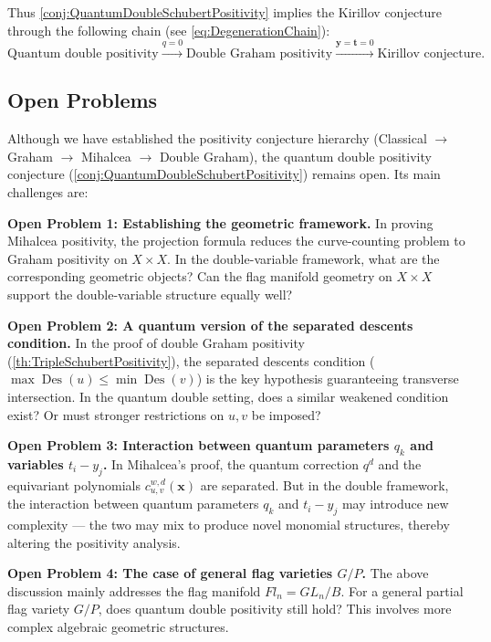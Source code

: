 Thus \cref{conj:QuantumDoubleSchubertPositivity} implies the Kirillov conjecture through the following chain (see \cref{eq:DegenerationChain}):
\begin{equation}
\label{eq:DegenerationChain}
\text{Quantum double positivity} \xrightarrow{q=0} \text{Double Graham positivity} \xrightarrow{\mathbf{y}=\mathbf{t}=0} \text{Kirillov conjecture}.
\end{equation}

\subsection{Open Problems}
\label{sec:OpenProblems}

Although we have established the positivity conjecture hierarchy (Classical $\to$ Graham $\to$ Mihalcea $\to$ Double Graham), the quantum double positivity conjecture (\cref{conj:QuantumDoubleSchubertPositivity}) remains open. Its main challenges are:

\textbf{Open Problem 1: Establishing the geometric framework.} In proving Mihalcea positivity, the projection formula reduces the curve-counting problem to Graham positivity on $X \times X$. In the double-variable framework, what are the corresponding geometric objects? Can the flag manifold geometry on $X \times X$ support the double-variable structure equally well?

\textbf{Open Problem 2: A quantum version of the separated descents condition.} In the proof of double Graham positivity (\cref{th:TripleSchubertPositivity}), the separated descents condition ($\max\operatorname{Des}(u) \leq \min\operatorname{Des}(v)$) is the key hypothesis guaranteeing transverse intersection. In the quantum double setting, does a similar weakened condition exist? Or must stronger restrictions on $u, v$ be imposed?

\textbf{Open Problem 3: Interaction between quantum parameters $q_k$ and variables $t_i - y_j$.} In Mihalcea's proof, the quantum correction $q^d$ and the equivariant polynomials $c_{u,v}^{w,d}(\mathbf{x})$ are separated. But in the double framework, the interaction between quantum parameters $q_k$ and $t_i - y_j$ may introduce new complexity --- the two may mix to produce novel monomial structures, thereby altering the positivity analysis.

\textbf{Open Problem 4: The case of general flag varieties $G/P$.} The above discussion mainly addresses the flag manifold $Fl_n = GL_n/B$. For a general partial flag variety $G/P$, does quantum double positivity still hold? This involves more complex algebraic geometric structures.

